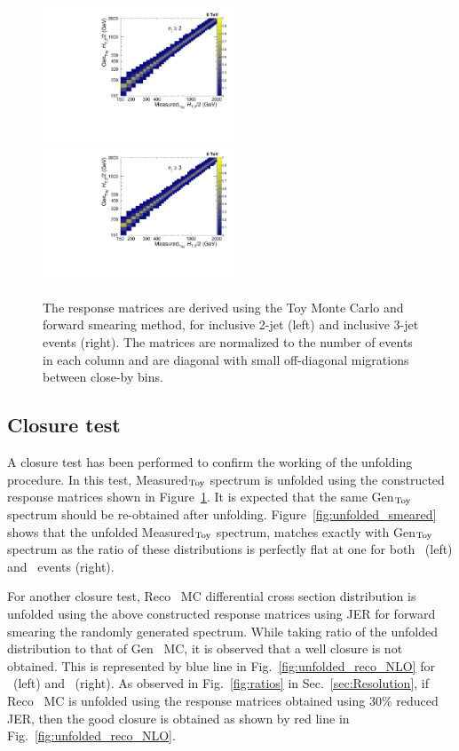 \begin{figure}[!htbp]
 \begin{center}
 \includegraphics[width=0.51\textwidth]{Plots_HT_2_150/Normalized_Response_Matrix_NLO_2_range_column.pdf}%
 ~~\includegraphics[width=0.51\textwidth]{Plots_HT_2_150/Normalized_Response_Matrix_NLO_3_column.pdf} 
 \caption{The response matrices are derived using the Toy Monte Carlo and forward smearing method, for inclusive 2-jet (left) and inclusive 3-jet events (right). The matrices are normalized to the number of events in each column and are diagonal with small off-diagonal migrations between close-by \httwo bins.}
 \label{fig:response_NLO}
 \end{center}
\end{figure}

\subsection{Closure test}
A closure test has been performed to confirm the working of the unfolding procedure. In this test, Measured$_{\rm Toy}$ spectrum is unfolded using the constructed response matrices shown in Figure~\ref{fig:response_NLO}. It is expected that the same Gen$_{\rm Toy}$  spectrum should be re-obtained after unfolding. Figure~\ref{fig:unfolded_smeared} shows that the unfolded Measured$_{\rm Toy}$ spectrum, matches exactly with Gen$_{\rm Toy}$ spectrum as the ratio of these distributions is perfectly flat at one for both \njt~(left) and \njth~events (right).

For another closure test, Reco \MGP~MC differential cross section distribution is unfolded using the above constructed response matrices using JER for forward smearing the randomly generated spectrum. While taking ratio of the unfolded distribution to that of Gen \MGP~MC, it is observed that a well closure is not obtained. This is represented by blue line in Fig.~\ref{fig:unfolded_reco_NLO} for \njt~(left) and \njth~(right). As observed in Fig.~\ref{fig:ratios} in Sec.~\ref{sec:Resolution}, if Reco \MGP~MC is unfolded using the response matrices obtained using 30\% reduced JER, then the good closure is obtained as shown by red line in Fig.~\ref{fig:unfolded_reco_NLO}.

